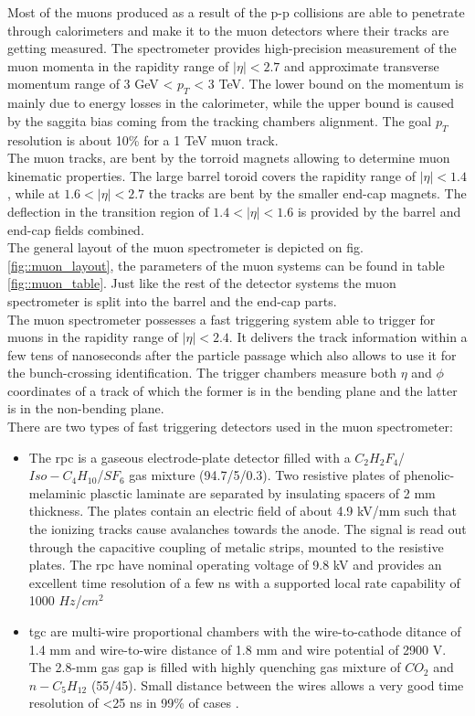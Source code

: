 	Most of the muons produced as a result of the p-p collisions are able to penetrate through calorimeters and make it to the muon detectors where their tracks are getting measured. The spectrometer provides high-precision measurement of the muon momenta in the rapidity range of $|\eta| < 2.7$ and approximate transverse momentum range of 3 GeV < $p_T$ < 3 TeV. The lower bound on the momentum is mainly due to energy losses in the calorimeter, while the upper bound is caused by the saggita bias coming from the tracking chambers alignment. The goal $p_T$ resolution is about 10\% for a 1 TeV muon track. \\
	The muon tracks\cite{muons_1},\cite{muons_2}  are bent by the torroid magnets allowing to determine muon kinematic properties. The large barrel toroid covers the rapidity range of $|\eta| < 1.4$, while at  $1.6 < |\eta| < 2.7$ the tracks are bent by the smaller end-cap magnets. The deflection in the transition region of $1.4 < |\eta| < 1.6$ is provided by the barrel and end-cap fields combined.\\
	The general layout of the muon spectrometer is depicted on fig. \ref{fig::muon_layout}, the parameters of the muon systems can be found in table \ref{fig::muon_table}. Just like the rest of the detector systems the muon spectrometer is split into the barrel and the end-cap parts. \\ 
	The muon spectrometer possesses a fast triggering system able to trigger for muons in the rapidity range of $|\eta| < 2.4$. It delivers the track information within a few tens of nanoseconds after the particle passage which also allows to use it for the bunch-crossing identification. The trigger chambers measure both $\eta$ and $\phi$ coordinates of a track of which the former is in the bending plane and the latter is in the non-bending plane.\\ 
	There are two types of fast triggering detectors used in the muon spectrometer:
		\begin{itemize}
		\item The \gls{rpc} is a gaseous electrode-plate detector filled with a $C_2H_2F_4$/$Iso-C_4H_{10}$/$SF_6$ gas mixture (94.7/5/0.3). Two resistive plates of phenolic-melaminic plasctic laminate are separated by insulating spacers of 2 mm thickness. The plates contain an electric field of about 4.9 kV/mm such that the ionizing tracks cause avalanches towards the anode. The signal is read out through the capacitive coupling of metalic strips, mounted to the resistive plates. The \gls{rpc} have nominal operating voltage of 9.8 kV and provides an excellent time resolution of a few ns with a supported local rate capability of 1000 $Hz$/$cm^2$
		\item \gls{tgc} are multi-wire proportional chambers with the wire-to-cathode ditance of 1.4 mm and wire-to-wire distance of 1.8 mm and wire potential of 2900 V. The 2.8-mm gas gap is filled with highly quenching gas mixture of $CO_2$ and $n-C_5H_{12}$ (55/45). Small distance between the wires allows a very good time resolution of <25 ns in 99\% of cases .
	\end{itemize} 
